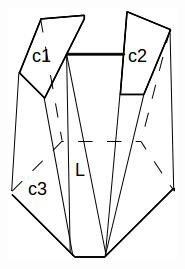 \documentclass[3p,times]{elsarticle}
\begin{document}
\begin{figure}[ht]
\begin{subfigure}[b]{0.1\textwidth}
\includegraphics[width=\textwidth]{../picture/branch-bridge.png}
\caption{}
\label{fig:branch-bridge}
\end{subfigure}
~
\begin{subfigure}[b]{0.1\textwidth}

\end{subfigure}
\end{figure}
\end{document}
